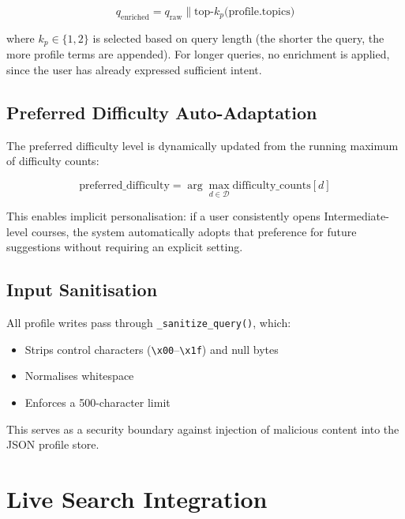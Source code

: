 \documentclass[12pt, a4paper]{article}
\begin{document}
\begin{equation}
    q_{\text{enriched}} = q_{\text{raw}} \mathbin{\|} \text{top-}k_p\bigl(\text{profile.topics}\bigr)
    \label{eq:enrich}
\end{equation}

where $k_p \in \{1, 2\}$ is selected based on query length (the shorter the query, the more
profile terms are appended). For longer queries, no enrichment is applied, since the user has
already expressed sufficient intent.

\subsection{Preferred Difficulty Auto-Adaptation}

The preferred difficulty level is dynamically updated from the running maximum of difficulty
counts:

\begin{equation}
    \text{preferred\_difficulty} = \arg\max_{d \in \mathcal{D}} \text{difficulty\_counts}[d]
    \label{eq:prefdiff}
\end{equation}

This enables implicit personalisation: if a user consistently opens Intermediate-level courses,
the system automatically adopts that preference for future suggestions without requiring an
explicit setting.

\subsection{Input Sanitisation}

All profile writes pass through \texttt{\_sanitize\_query()}, which:
\begin{itemize}
    \item Strips control characters (\texttt{\textbackslash x00}–\texttt{\textbackslash x1f}) and null bytes
    \item Normalises whitespace
    \item Enforces a 500-character limit
\end{itemize}
This serves as a security boundary against injection of malicious content into the JSON profile
store.

\section{Live Search Integration}
\label{sec:live_search}
\end{document}
